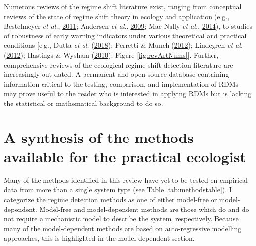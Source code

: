 \documentclass[print]{nuthesis}
\begin{document}
Numerous reviews of the regime shift literature exist, ranging from conceptual reviews of the state of regime shift theory in ecology and application (e.g., Bestelmeyer \emph{et al.}, \protect\hyperlink{ref-bestelmeyer_analysis_2011}{2011}; Andersen \emph{et al.}, \protect\hyperlink{ref-andersen_ecological_2009}{2009}; Mac Nally \emph{et al.}, \protect\hyperlink{ref-mac2014scrutiny}{2014}), to studies of robustness of early warning indicators under various theoretical and practical conditions {[}e.g., Dutta \emph{et al.} (\protect\hyperlink{ref-dutta2018robustness}{2018}); Perretti \& Munch (\protect\hyperlink{ref-perretti2012regime}{2012}); Lindegren \emph{et al.} (\protect\hyperlink{ref-lindegren_early_2012}{2012}); Hastings \& Wysham (\protect\hyperlink{ref-hastings2010regime}{2010}); Figure \ref{fig:revArtNums}{]}. Further, comprehensive reviews of the ecological regime shift detection literature are increasingly out-dated. A permanent and open-source database containing information critical to the testing, comparison, and implementation of RDMs may prove useful to the reader who is interested in applying RDMs but is lacking the statistical or mathematical background to do so.

\hypertarget{a-synthesis-of-the-methods-available-for-the-practical-ecologist}{%
\section{A synthesis of the methods available for the practical ecologist}\label{a-synthesis-of-the-methods-available-for-the-practical-ecologist}}

Many of the methods identified in this review have yet to be tested on empirical data from more than a single system type (see Table \ref{tab:methodstable}). I categorize the regime detection methods as one of either model-free or model-dependent. Model-free and model-dependent methods are those which do and do not require a mechanistic model to describe the system, respectively. Because many of the model-dependent methods are based on auto-regressive modelling approaches, this is highlighted in the model-dependent section.
\end{document}
